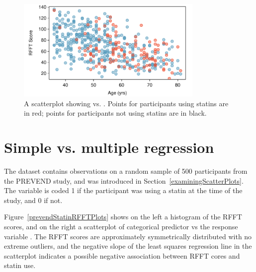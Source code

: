 \begin{figure}[h!]
	\centering
	\includegraphics[width=0.8\textwidth]
	{ch_multiple_linear_regression_oi_biostat/figures/prevendAgeRFFTConfounderPlot/prevendAgeRFFTConfounderPlot}
	\caption{A scatterplot showing  vs. . Points for participants using statins are in red; points for participants not using statins are in black.}
	\label{prevendAgeRFFTConfounderPlot}
\end{figure}

\section{Simple vs. multiple regression}
\label{simpleVsMultipleRegression}

The dataset  contains observations on a random sample of 500 participants from the PREVEND study, and was introduced in Section~\ref{examiningScatterPlots}.  The variable  is coded 1 if the participant was using a statin at the time of the study, and 0 if not.  

Figure~\ref{prevendStatinRFFTPlots} shows on the left a histogram of the RFFT scores, and on the right a scatterplot of categorical predictor  vs the response variable .  The RFFT scores are approximately  symmetrically distributed with no extreme outliers, and the negative slope of the least squares regression line in the scatterplot indicates a possible negative association between RFFT cores and statin use.

